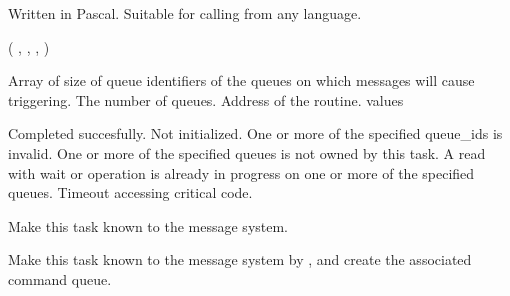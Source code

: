 \begin{appendix}
\begin{manroutinedescription}
      Written in Pascal. Suitable for calling from any language.

      {} {\mantt{=}} {} ( {}, {}, {},
                         {} )

\begin{manparametertable}
 Array of size %
{}
                         of queue identifiers of the queues on which
                         messages will cause {} triggering.
                         The number of queues.
                         Address of the {} routine.
      {} values
\end{manparametertable}
\begin{mantwocolumntable}
  Completed succesfully.
  {} Not initialized.
  One or more of the specified %
queue\_ids
                             is invalid.
 One or more of the specified %
queues is
                             not owned by this task.
 A read with wait or {} operation
                             is already in progress on one or more
                             of the specified queues.
 Timeout accessing critical code.
\end{mantwocolumntable}
\end{manroutinedescription}
\begin{manroutinedescription}
      Make this task known to the message system.

      Make this task known to the message system by {}, and
      create the associated command queue.


\end{manroutinedescription}
\end{appendix}
